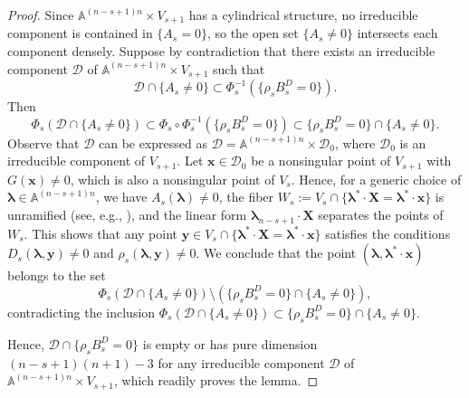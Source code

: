 \documentclass[pdflatex,sn-basic]{sn-jnl}%
\theoremstyle{thmstyleone}%
\theoremstyle{thmstyletwo}%
\theoremstyle{thmstylethree}%
\theoremstyle{definition}
\numberwithin{equation}{section}
\newcommand{\bfs}{\boldsymbol}
\newcommand{\A}{\mathbb A}
\begin{document}
\begin{proof}
Since $\A^{(n-s+1)n}\times V_{s+1}$ has a cylindrical structure,
no irreducible component is contained
in $\{A_s=0\}$, so the open set $\{A_s\not=0\}$ intersects
each component densely. Suppose by contradiction that there
exists an irreducible component $\mathcal{D}$ of
$\A^{(n-s+1)n}\times V_{s+1}$ such that %
%
$$\mathcal{D}\cap\{A_s\not=0\}\subset\Phi_s^{-1}(\{\rho_sB_s^D=0\}).
$$
%
Then
%
$$\Phi_s(\mathcal{D}\cap\{A_s\not=0\})\subset \Phi_s\circ
\Phi_s^{-1}(\{\rho_sB_s^D=0\})\subset\{\rho_s
B_s^D=0\} \cap\{A_s\not=0\}.$$
%
Observe that
$\mathcal{D}$ can be expressed as $\mathcal{D}=\A^{(n-s+1)n}\times
\mathcal{D}_0$, where $\mathcal{D}_0$ is an irreducible component of
$V_{s+1}$. Let $\bfs x\in\mathcal{D}_0$ be a nonsingular point of
$V_{s+1}$ with $G(\bfs x)\not=0$, which is also a nonsingular point of $V_s$. Hence, for a
generic choice of $\bfs\lambda\in\A^{(n-s+1)n}$, we have $A_s(\bfs\lambda)\not=0$, the fiber
$W_s:=V_s\cap \{\bfs \lambda^*\cdot\bfs X=\bfs \lambda^*\cdot\bfs
x\}$ is unramified (see, e.g., \cite[\S 5A]{Mumford95}), and the
linear form $\bfs \lambda_{n-s+1}\cdot\bfs X$ separates the points
of $W_s$. This shows that any point $\bfs y\in V_s\cap
\{\bfs\lambda^*\cdot\bfs X=\bfs \lambda^*\cdot\bfs x\}$ satisfies the
conditions $D_s(\bfs\lambda,\bfs y)\not=0$ and $\rho_s(\bfs
\lambda,\bfs y)\not=0$. We conclude that the point $(\bfs
\lambda,\bfs \lambda^*\cdot\bfs x)$ belongs to the set
$$\Phi_s(\mathcal{D} \cap\{A_s\not=0\})\setminus(\{\rho_sB_s^D=0\} \cap\{A_s\not=0\}),$$
%
contradicting the inclusion
$\Phi_s(\mathcal{D} \cap\{A_s\not=0\})\subset \{\rho_s B_s^D=0\} \cap\{A_s\not=0\}$.

Hence, $\mathcal{D}\cap\{\rho_sB_s^D=0\}$ is empty or has pure
dimension $(n-s+1)(n+1)-3$ for any irreducible component
$\mathcal{D}$ of $\A^{(n-s+1)n}\times V_{s+1}$, which readily proves
the lemma.
\end{proof}
\end{document}
